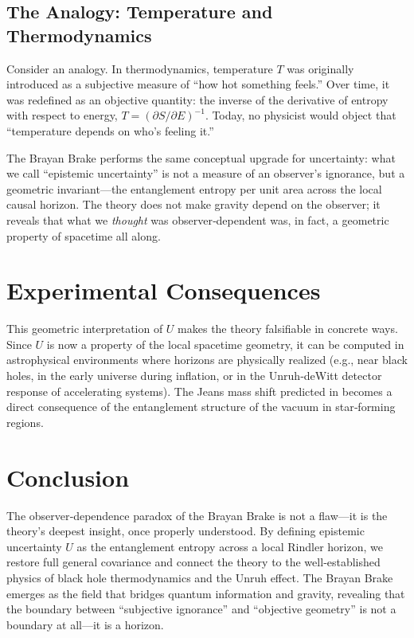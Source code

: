 \documentclass[11pt]{article}
\begin{document}
\subsection{The Analogy: Temperature and Thermodynamics}

Consider an analogy. In thermodynamics, temperature \(T\) was originally introduced as a subjective measure of “how hot something feels.” Over time, it was redefined as an objective quantity: the inverse of the derivative of entropy with respect to energy, \(T = (\partial S/\partial E)^{-1}\). Today, no physicist would object that “temperature depends on who's feeling it.”

The Brayan Brake performs the same conceptual upgrade for uncertainty: what we call “epistemic uncertainty” is not a measure of an observer's ignorance, but a geometric invariant—the entanglement entropy per unit area across the local causal horizon. The theory does not make gravity depend on the observer; it reveals that what we \emph{thought} was observer‑dependent was, in fact, a geometric property of spacetime all along.

\section{Experimental Consequences}
\label{sec:experiments}

This geometric interpretation of \(U\) makes the theory falsifiable in concrete ways. Since \(U\) is now a property of the local spacetime geometry, it can be computed in astrophysical environments where horizons are physically realized (e.g., near black holes, in the early universe during inflation, or in the Unruh‑deWitt detector response of accelerating systems). The Jeans mass shift predicted in \cite{brayan_brake_initial} becomes a direct consequence of the entanglement structure of the vacuum in star‑forming regions.

\section{Conclusion}
\label{sec:conclusion}

The observer‑dependence paradox of the Brayan Brake is not a flaw—it is the theory's deepest insight, once properly understood. By defining epistemic uncertainty \(U\) as the entanglement entropy across a local Rindler horizon, we restore full general covariance and connect the theory to the well‑established physics of black hole thermodynamics and the Unruh effect. The Brayan Brake emerges as the field that bridges quantum information and gravity, revealing that the boundary between “subjective ignorance” and “objective geometry” is not a boundary at all—it is a horizon.
\end{document}
